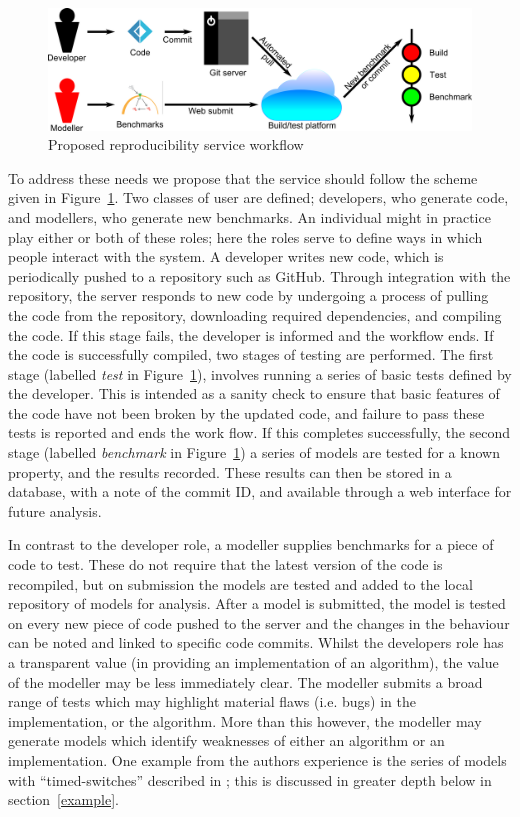 \documentclass{llncs}
\begin{document}
\begin{figure}[!ht]
	\centering
	\includegraphics[width=\textwidth]{workflow}
	\caption{Proposed reproducibility service workflow}
	\label{schematic}
\end{figure}
	
To address these needs we propose that the service should follow the
scheme given in Figure~\ref{schematic}. Two classes of user are
defined; developers, who generate code, and modellers, who generate
new benchmarks. An individual might in practice play either or both of
these roles; here the roles serve to define ways in which people
interact with the system. A developer writes new code, which is
periodically pushed to a repository such as GitHub. Through
integration with the repository, the server responds to new code by
undergoing a process of pulling the code from the repository,
downloading required dependencies, and compiling the code. If this
stage fails, the developer is informed and the workflow ends. If the
code is successfully compiled, two stages of testing are
performed. The first stage (labelled {\emph{test}} in
Figure~\ref{schematic}), involves running a series of basic tests
defined by the developer. This is intended as a sanity check to ensure
that basic features of the code have not been broken by the updated
code, and failure to pass these tests is reported and ends the work
flow. If this completes successfully, the second stage (labelled
{\emph{benchmark}} in Figure~\ref{schematic}) a series of models are
tested for a known property, and the results recorded. These results
can then be stored in a database, with a note of the commit ID, and
available through a web interface for future analysis.

In contrast to the developer role, a modeller supplies benchmarks for
a piece of code to test. These do not require that the latest version
of the code is recompiled, but on submission the models are tested and
added to the local repository of models for analysis. After a model is
submitted, the model is tested on every new piece of code pushed to
the server and the changes in the behaviour can be noted and linked to
specific code commits. Whilst the developers role has a transparent
value (in providing an implementation of an algorithm), the value of
the modeller may be less immediately clear. The modeller submits a
broad range of tests which may highlight material flaws (i.e. bugs) in
the implementation, or the algorithm. More than this however, the
modeller may generate models which identify weaknesses of either an
algorithm or an implementation. One example from the authors
experience is the series of models with ``timed-switches'' described
in \cite{cook2014}; this is discussed in greater depth below in
section~\ref{example}.
\end{document}
